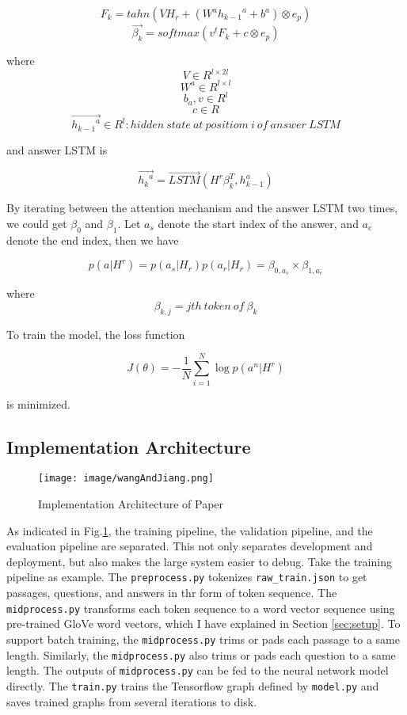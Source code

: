\documentclass[12pt]{article}
\begin{document}
$$F_k = tahn(VH_r + (W^a{h_{k-1}}^a +  b^a) \otimes e_p)$$
$$\overrightarrow{\beta _k} = softmax(v^tF_k + c \otimes e_p)$$


where
$$V \in R^{l \times 2l}$$
$$W^a\in R^{l \times l} $$
$$b_a, v\in R^{l}  $$
$$c \in R $$
$$\overrightarrow{{h_{k-1}}^a}\in R^{l}: hidden\ state\ at\ positiom\ i\ of\ answer\ LSTM  $$

and answer LSTM is


$$\overrightarrow{{h_k}^a} = \overrightarrow{LSTM}(H^r\beta _k^T, h_{k-1}^a)$$

By iterating between the attention mechanism and the answer LSTM two times, we could get $\beta _0$ and $\beta _1$. Let $a_s$ denote the start index of the answer, and $a_e$ denote the end index, then we have

$$p(a|H^r) = p(a_s|H_r)p(a_r|H_r)=\beta _{0, a_s} \times \beta_{1, a_e}$$

where $$\beta_{k, j} = jth\ token\ of\ \beta _k$$

To train the model, the loss function

$$J(\theta) = -\frac{1}{N}\sum_{i=1}^{N} \log{p(a^n|H^r)} $$

is minimized.


\subsection{Implementation Architecture}\label{sec:architectures}


\begin{figure}[h]
\texttt{[image: image/wangAndJiang.png]}
\centering
\caption{Implementation Architecture of Paper \cite{wang2016machine}}
\label{fig:wangAndJiang}
\end{figure}

As indicated in Fig.\ref{fig:wangAndJiang}, the training pipeline, the validation pipeline, and the evaluation pipeline are separated. This not only separates development and deployment, but also makes the large system easier to debug. Take the training pipeline as example. The \texttt{preprocess.py} tokenizes \texttt{raw\_train.json} to get passages, questions, and answers in thr form of token sequence. The \texttt{midprocess.py} transforms each token sequence to a word vector sequence using pre-trained GloVe word vectors, which I have explained in Section \ref{sec:setup}. To support batch training, the \texttt{midprocess.py} trims or pads each passage to a same length. Similarly, the \texttt{midprocess.py} also trims or pads each question to a same length. The outputs of \texttt{midprocess.py} can be fed to the neural network model directly. The \texttt{train.py} trains the Tensorflow graph defined by \texttt{model.py} and saves trained graphs from several iterations to disk.
\end{document}
